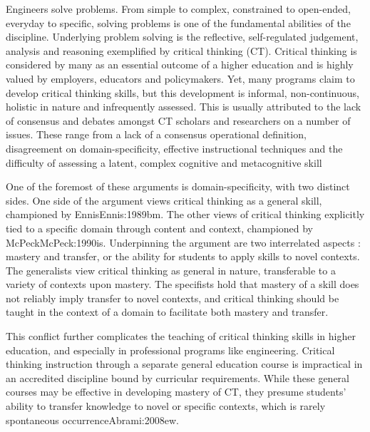 Engineers solve problems.  From simple to complex, constrained to open-ended, everyday to specific, solving problems is one of the fundamental abilities of the discipline.  Underlying problem solving is the reflective, self-regulated judgement, analysis and reasoning exemplified by critical thinking (CT).  Critical thinking is considered by many as an essential outcome of a higher education and is highly valued by employers, educators and policymakers.  Yet, many  programs claim to develop critical thinking skills, but this development is informal, non-continuous, holistic in nature and infrequently assessed\cite{Paul:1997ti, Ahern:2012ey}.  This is usually attributed to the lack of consensus and debates amongst CT scholars and researchers on a number of issues.  These range from a lack of a consensus operational definition, disagreement on domain-specificity\cite{Ennis:1989bm, McPeck:1990is}, effective instructional techniques\cite{Tsui:2002cc} and the difficulty of assessing a latent, complex cognitive and metacognitive skill\cite{Ennis:1993us, Halpern:2003tt}
 
One of the foremost of these arguments is domain-specificity, with two distinct sides.  One side of the argument views critical thinking as a general skill, championed by Ennis{Ennis:1989bm}.  The other views of critical thinking explicitly tied to a specific domain through content and context, championed by McPeck{McPeck:1990is}.  Underpinning the argument are two interrelated aspects : mastery and transfer, or the ability for students to apply skills to novel contexts. The generalists view critical thinking as general in nature, transferable to a variety of contexts upon mastery.  The specifists hold that mastery of a skill does not reliably imply transfer to novel contexts, and critical thinking should be taught in the context of a domain to facilitate both mastery and transfer.  

This conflict further complicates the teaching of critical thinking skills in higher education, and especially in professional programs like engineering.  Critical thinking instruction through a separate general education course is impractical in an accredited discipline bound by curricular requirements.  While these general courses may be effective in developing mastery of CT, they presume students’ ability to transfer knowledge to novel or specific contexts, which is rarely spontaneous occurrence{Abrami:2008ew}.

